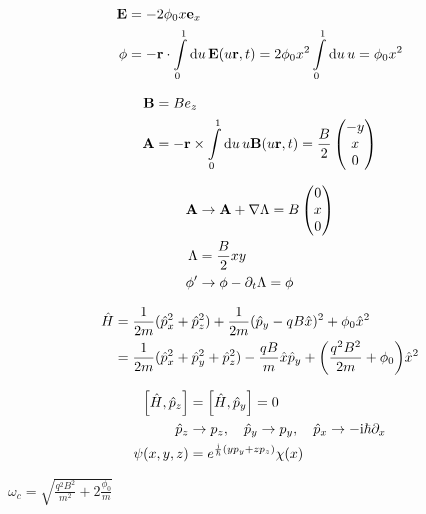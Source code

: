 \documentclass[a4paper,10pt]{article}
\newcommand{\mi}{\mathrm{i}}
\newcommand{\intl}{\int\limits}
\begin{document}
\begin{align}
    \vb{E}
    &=
    -2\phi_0 x\vb{e}_x
\\
    \phi
    &=
    -
    \vb{r}
    \cdot
    \intl_0^1
    \dd{u}
    \vb{E}(u\vb{r},t)
    =
    2\phi_0
    x^2
    \intl_0^1
    \dd{u}
    u
    =
    \phi_0
    x^2
\end{align}


\begin{align}
    \vb{B}
    &=
    B{e}_z
\\
    \vb{A}
    &=
    -
    \vb{r}
    \times
    \intl_0^1
    \dd{u}
    u
    \vb{B}(u\vb{r},t)
    =
    \frac{B}{2}
    \pmqty{
        -y\\x\\0
    }
\end{align}

\begin{align}
    \vb{A}
    &\to
    \vb{A}
    +
    \nabla
    \Lambda
    =
    B
    \pmqty{
        0\\x\\0
    }
\\
    \Lambda
    &=
    \frac{B}{2}
    xy
\\
    \phi^\prime
    &\to
    \phi-\partial_t \Lambda=\phi
\end{align}

\begin{align}
    \hat{H}
    &=
    \frac{1}{2m}
    (\hat{p}_x^2+\hat{p}_z^2)
    +
    \frac{1}{2m}
    (\hat{p}_y-qB\hat{x})^2
    +
    \phi_0
    \hat{x}^2
\\
    &=
    \frac{1}{2m}
    (\hat{p}_x^2+\hat{p}_y^2+\hat{p}_z^2)
    -
    \frac{qB}{m}
    \hat{x}
    \hat{p}_y
    +
    \pqty{
	    \frac{q^2B^2}{2m}
	    +
    		\phi_0
    	}
    \hat{x}^2
\end{align}


\begin{align}
    \bqty{
        \hat{H}
        ,
        \hat{p}_z
    }
    &=
    \bqty{
        \hat{H}
        ,
        \hat{p}_y
    }
    =
    0
\\
    \hat{p}_z
    &\to
    p_z
    ,\quad
    \hat{p}_y
    \to
    p_y
    ,\quad
    \hat{p}_x
    \to
    -\mi\hbar\partial_x
\\
    \psi(x,y,z)
    &=
    e^{
        \frac{\mi}{\hbar}
        (yp_y+zp_z)
    }
    \chi(x)
\end{align}


$\omega_c=\sqrt{\frac{q^2 B^2}{m^2}+2\frac{\phi_0}{m}}$
\end{document}
